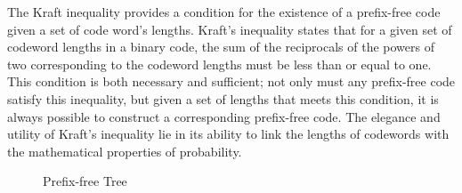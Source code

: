 The Kraft inequality provides a condition for the existence of a prefix-free code given a set of code word's lengths. Kraft's inequality states that for a given set of codeword lengths in a binary code, the sum of the reciprocals of the powers of two corresponding to the codeword lengths must be less than or equal to one. This condition is both necessary and sufficient; not only must any prefix-free code satisfy this inequality, but given a set of lengths that meets this condition, it is always possible to construct a corresponding prefix-free code. The elegance and utility of Kraft's inequality lie in its ability to link the lengths of codewords with the mathematical properties of probability.

\begin{figure}[t]
\centering
{}
\caption{\label{fig:Prefix-Free-Tree}Prefix-free Tree}
\end{figure}

